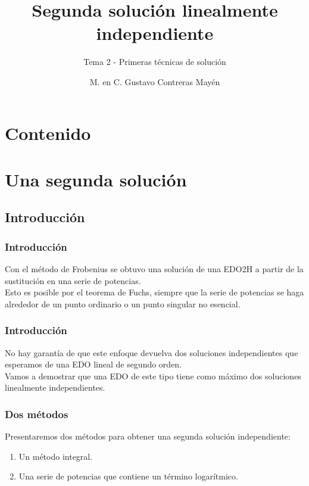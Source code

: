 \documentclass[12pt]{beamer}
\date{}
\title{\large{Segunda solución linealmente independiente}}
\subtitle{Tema 2 - Primeras técnicas de solución}
\author{M. en C. Gustavo Contreras Mayén}
\begin{document}
\maketitle
\fontsize{14}{14}\selectfont
{}

\section*{Contenido}

\section{Una segunda solución}
\subsection{Introducción}

\begin{frame}
\frametitle{Introducción}
Con el método de Frobenius se obtuvo una solución de una EDO2H a partir de la sustitución en una serie de potencias.
\\
\bigskip
\pause
Esto es posible por el teorema de Fuchs, siempre que la serie de potencias se haga alrededor de un punto ordinario o un punto singular no esencial.
\end{frame}
\begin{frame}
\frametitle{Introducción}
No hay garantía de que este enfoque devuelva dos soluciones independientes que esperamos de una EDO lineal de segundo orden.
\\
\bigskip
\pause
Vamos a demostrar que una EDO de este tipo tiene como máximo dos soluciones linealmente independientes. 
\end{frame}
\begin{frame}
\frametitle{Dos métodos}
Presentaremos dos métodos para obtener una segunda solución independiente:
\pause
{}
\begin{enumerate}[<+->]
\item Un método integral.
\item Una serie de potencias que contiene un término logarítmico.
\end{enumerate}
\end{frame}
\end{document}
